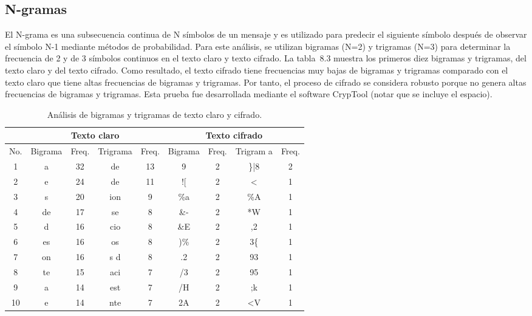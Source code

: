 \subsection{N-gramas}
El N-grama es una subsecuencia continua de N símbolos de un mensaje y es utilizado para predecir el siguiente símbolo después de observar el símbolo N-1 mediante métodos de probabilidad. Para este análisis, se utilizan bigramas (N=2) y trigramas (N=3) para determinar la frecuencia de 2 y de 3 símbolos continuos en el texto claro y texto cifrado. La tabla~8.3 muestra los primeros diez bigramas y trigramas, del texto claro y del texto cifrado. Como resultado, el texto cifrado tiene frecuencias muy bajas de bigramas y trigramas comparado con el texto claro que tiene altas frecuencias de bigramas y trigramas. Por tanto, el proceso de cifrado se considera robusto porque no genera altas frecuencias de bigramas y trigramas. Esta prueba fue desarrollada mediante el software CrypTool (notar que se incluye el espacio).

\begin{table}[!htbp] %
	\center
	\begin{tabular}{c c c c c c c c c}
	\hline
			& \multicolumn{4}{c}{Texto claro} & \multicolumn{4}{c}{Texto cifrado} \\
	\hline
	No.	&	Bigrama	&	Freq.	&	Trigrama	&	Freq.	&	Bigrama	&	Freq.	&	Trigram	a&	Freq. 	\\
	\hline
	1	&	a		&	32		&	 de		&	13		&	 9		&	2		&	 \}|8		&	2	\\
	2	&	e		&	24	 	&	de		&	11		&	![		&	2		&	   <		&	1	\\
	3	&	s 		&	20		&	ion		&	9		&	\%a		&	2		&	 \%A 		&	1	\\	
	4	&	de		&	17		&	 se		&	8		&	\&-		&	2		&	 *W			&	1	\\
	5	&	 d		&	16		&	cio		&	8		&	\&E		&	2		&	  ,2		&	1	\\
	6	&	es		&	16		&	os		&	8		&	)\%		&	2		&	 3\{			&	1	\\
	7	&	on 		&	16		&	s d		&	8		&	.2		&	2		&	 93			&	1	\\
	8	&	te		&	15		&	aci 	&	7		&	/3		&	2		&	 95			&	1	\\
	9	&	 a		&	14		&	est 	&	7		&	/H		&	2		&	;k			&	1	\\
	10	&	 e		&	14		&	nte 	&	7		&	2A		&	2		&	<V			&	1	\\	
	\hline
	\end{tabular}
	\caption{Análisis de bigramas y trigramas de texto claro y cifrado.}
\end{table}

